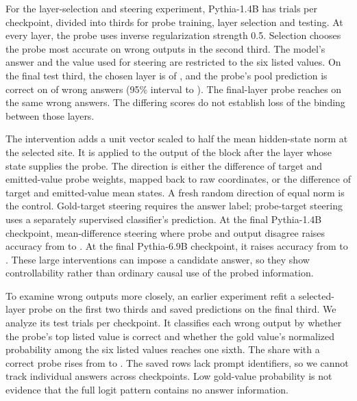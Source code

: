 \documentclass{article}
\begin{document}
For the layer-selection and steering experiment, Pythia-1.4B has \DvStTrials{} trials per checkpoint, divided into thirds for probe training, layer selection and testing.
At every layer, the probe uses inverse regularization strength 0.5.
Selection chooses the probe most accurate on wrong outputs in the second third.
The model's answer and the value used for steering are restricted to the six listed values.
On the final test third, the chosen layer is \DvStLayer{} of \DvStFinalLayer{}, and the probe's pool prediction is correct on \DvStProbeWrong{} of \DvStWrong{} wrong answers (95\% interval \DvStProbeWrongLo{} to \DvStProbeWrongHi{}).
The final-layer probe reaches \DvStProbeWrongFinal{} on the same wrong answers.
The differing scores do not establish loss of the binding between those layers.

The intervention adds a unit vector scaled to half the mean hidden-state norm at the selected site.
It is applied to the output of the block after the layer whose state supplies the probe.
The direction is either the difference of target and emitted-value probe weights, mapped back to raw coordinates, or the difference of target and emitted-value mean states.
A fresh random direction of equal norm is the control.
Gold-target steering requires the answer label; probe-target steering uses a separately supervised classifier's prediction.
At the final Pythia-1.4B checkpoint, mean-difference steering where probe and output disagree raises accuracy from \DvStAcc{} to \DvGatedFinal{}.
At the final Pythia-6.9B checkpoint, it raises accuracy from \DvSixGatedBase{} to \DvSixGatedFinal{}.
These large interventions can impose a candidate answer, so they show controllability rather than ordinary causal use of the probed information.

\begin{table}[t]
\centering
\caption{Earlier Pythia-1.4B layer-selection and steering results on the final test third.
Wrong: number of wrong outputs.
Probe on wrong: accuracy conditional on a wrong output at the selected and final layers.
Repair rates condition on wrong outputs.
Model and steered columns give overall test accuracy.}
\label{tab:steer}
\small

\end{table}

To examine wrong outputs more closely, an earlier experiment refit a selected-layer probe on the first two thirds and saved predictions on the final third.
We analyze its \DvPostN{} test trials per checkpoint.
It classifies each wrong output by whether the probe's top listed value is correct and whether the gold value's normalized probability among the six listed values reaches one sixth.
The share with a correct probe rises from \DvPostProbeRightFirst{} to \DvPostProbeRightFinal{}.
The saved rows lack prompt identifiers, so we cannot track individual answers across checkpoints.
Low gold-value probability is not evidence that the full logit pattern contains no answer information.
\end{document}
